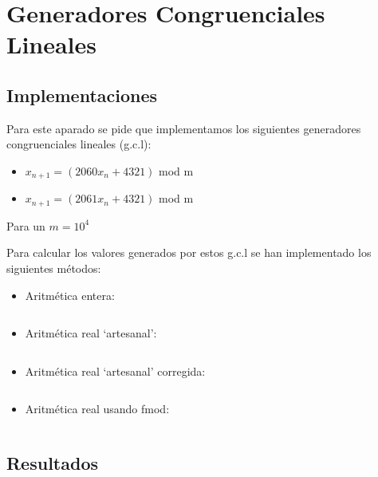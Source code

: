 \section{Generadores Congruenciales Lineales}

\subsection{Implementaciones}

Para este aparado se pide que implementamos los siguientes generadores congruenciales lineales (g.c.l):

\begin{itemize}
	\item $x_{n+1} = (2060x_n + 4321)$ mod m
	\item $x_{n+1} = (2061x_n + 4321)$ mod m
\end{itemize}

Para un $ m = 10^4 $

Para calcular los valores generados por estos g.c.l se han implementado los siguientes métodos:

\begin{itemize}
	\item Aritmética entera:
		\inputminted[firstline=12, lastline=12]{c++}{../src/gen_congr.cpp}
	\item Aritmética real `artesanal':
		\inputminted[firstline=16, lastline=18]{c++}{../src/gen_congr.cpp}
	\item Aritmética real `artesanal' corregida:
		\inputminted[firstline=35, lastline=38]{c++}{../src/gen_congr.cpp}
	\item Aritmética real usando fmod:
		\inputminted[firstline=42, lastline=42]{c++}{../src/gen_congr.cpp}
\end{itemize}

\subsection{Resultados}

